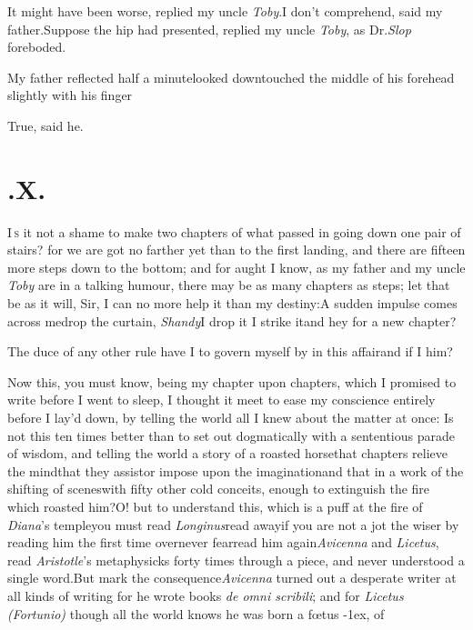 \documentclass{article}
\begin{document}
It might have been worse, replied my uncle
\textit{Toby}.\tsk I don’t comprehend, said my
father.\tsk Suppose the hip had presented, replied my
uncle \textit{Toby}, as Dr.\@ \textit{Slop} foreboded.

My father reflected half a minute\tsk looked down\tsk touched the middle of his
forehead slightly with his finger\tsh

\tsk True, said he.

\newpage
\null\smallskip
\section{.\enspace X.}

\lettrine{I}{\,s} it not a shame to make two chapters of what passed in going down one
pair of stairs? for we are got no farther yet than to the first landing, and there
are fifteen more steps down to the bottom; and for aught I know, as my father and my
uncle \textit{Toby} are in a talking humour, there may be as
many chapters as steps;\tsk
let that be as it will, Sir, I can no more help it than my destiny:\tsk A sudden
impulse comes across me\tsh drop the curtain,
\textit{Shandy}\tsk I drop it\tsh 
{}\break
\tsk I strike it\tsk and hey for a new chapter?

The duce of any other rule have I to govern myself by in
this affair\tsk and if I\pb
{}
him?

Now this, you must know, being my chapter upon chapters,
which I promised to write before I went to sleep, I thought
it meet to ease my conscience entirely before I lay’d down,
by telling the world all I knew about the matter at once: Is
not this ten times better than to set out dogmatically with
a sententious parade of wisdom, and telling the world a
story of a roasted horse\tsk that chapters relieve the
mind\tsk that they assist\tsk or impose upon the
imagination\tsk and that in a work of\break
{}\pb 
the shifting of scenes\tsh with
fifty other cold conceits, enough to extinguish the fire
which roasted him?\tsk O! but to understand this, which is a
puff at the fire of \textit{Diana}’s temple\tsk you must
read \textit{Longinus}\tsk read away\tsk if you are not a
jot the wiser by reading him the first time over\tsk never
fear\tsk read him again\tsk \textit{Avicenna} and
\textit{Licetus}, read \textit{Aristotle}’s metaphysicks
forty times through a piece, and never understood a single
word.\tsk But mark the consequence\tsk \textit{Avicenna}
turned out a desperate writer at all kinds of writing\tsk
for he wrote books \textit{de omni scribili}; and for
\textit{Licetus (Fortunio)} though all the world knows he
was born a fœtus \lower-1ex\hbox{\ast}, of\break
\end{document}
